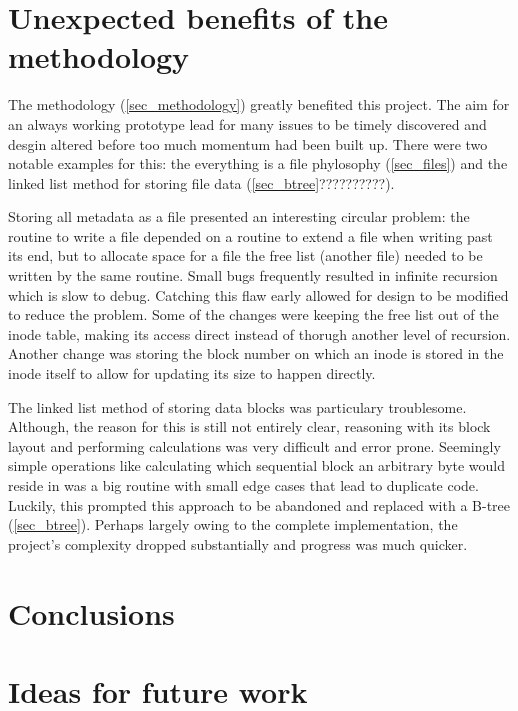    \section{Unexpected benefits of the methodology}

        The methodology (\ref{sec_methodology}) greatly benefited this project.
        The aim for an always working prototype lead for many issues to be
        timely discovered and desgin altered before too much momentum had been
        built up. There were two notable examples for this: the everything is a
        file phylosophy (\ref{sec_files}) and the linked list method for
        storing file data (\ref{sec_btree}??????????).

        Storing all metadata as a file presented an interesting circular
        problem: the routine to write a file depended on a routine to extend a
        file when writing past its end, but to allocate space for a file the
        free list (another file) needed to be written by the same routine.
        Small bugs frequently resulted in infinite recursion which is slow to
        debug. Catching this flaw early allowed for design to be modified to
        reduce the problem.  Some of the changes were keeping the free list out
        of the inode table, making its access direct instead of thorugh another
        level of recursion.  Another change was storing the block number on
        which an inode is stored in the inode itself to allow for updating its
        size to happen directly.

        The linked list method of storing data blocks was particulary
        troublesome. Although, the reason for this is still not entirely clear,
        reasoning with its block layout and performing calculations was very
        difficult and error prone. Seemingly simple operations like calculating
        which sequential block an arbitrary byte would reside in was a big
        routine with small edge cases that lead to duplicate code. Luckily,
        this prompted this approach to be abandoned and replaced with a B-tree
        (\ref{sec_btree}). Perhaps largely owing to the complete
        implementation, the project's complexity dropped substantially and
        progress was much quicker.

    \section{Conclusions}

    \section{Ideas for future work}

